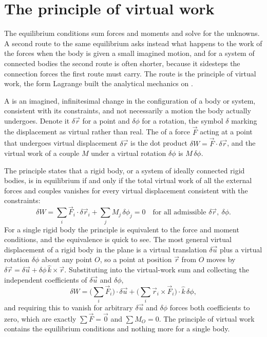 \section{The principle of virtual work}

The equilibrium conditions sum forces and moments and solve for the
unknowns. A second route to the same equilibrium asks instead what
happens to the work of the forces when the body is given a small
imagined motion, and for a system of connected bodies the second route is
often shorter, because it sidesteps the connection forces the first route
must carry. The route is the principle of virtual work, the form
Lagrange built the analytical mechanics on \cite{hist:lagrange1788}.

A  is an imagined, infinitesimal change in
the configuration of a body or system, consistent with its constraints,
and not necessarily a motion the body actually undergoes. Denote it
$\delta\vec{r}$ for a point and $\delta\phi$ for a rotation, the symbol
$\delta$ marking the displacement as virtual rather than real. The
 of a force $\vec{F}$ acting at a point that
undergoes virtual displacement $\delta\vec{r}$ is the dot product
$\delta W = \vec{F}\cdot\delta\vec{r}$, and the virtual work of a couple
$M$ under a virtual rotation $\delta\phi$ is $M\,\delta\phi$.

The principle states that a rigid body, or a system of ideally connected
rigid bodies, is in equilibrium if and only if the total virtual work of
all the external forces and couples vanishes for every virtual
displacement consistent with the constraints:
\[
\delta W = \sum_i \vec{F}_i\cdot\delta\vec{r}_i
+ \sum_j M_j\,\delta\phi_j = 0 \quad\text{for all admissible }
\delta\vec{r},\ \delta\phi.
\]
For a single rigid body the principle is equivalent to the force and
moment conditions, and the equivalence is quick to see. The most general
virtual displacement of a rigid body in the plane is a virtual
translation $\delta\vec{u}$ plus a virtual rotation $\delta\phi$ about any
point $O$, so a point at position $\vec{r}$ from $O$ moves by
$\delta\vec{r} = \delta\vec{u} + \delta\phi\,\hat{k}\times\vec{r}$.
Substituting into the virtual-work sum and collecting the independent
coefficients of $\delta\vec{u}$ and $\delta\phi$,
\[
\delta W = \Big(\sum_i\vec{F}_i\Big)\cdot\delta\vec{u}
+ \Big(\sum_i \vec{r}_i\times\vec{F}_i\Big)\cdot\hat{k}\,\delta\phi,
\]
and requiring this to vanish for arbitrary $\delta\vec{u}$ and
$\delta\phi$ forces both coefficients to zero, which are exactly
$\sum\vec{F} = \vec{0}$ and $\sum M_O = 0$. The principle of virtual work
contains the equilibrium conditions and nothing more for a single body.

